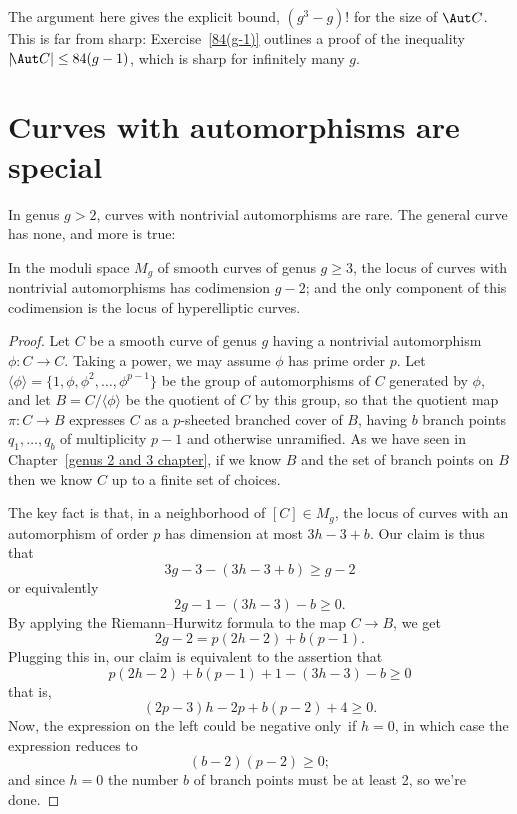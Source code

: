 The argument here gives the explicit bound,
$(g^3-g)!$
for the size
of $\Aut C$. This is far from sharp:
Exercise~\ref{84(g-1)} 
outlines a proof of
the inequality
$|\!\Aut C| \leq 84(g-1)$, which is 
sharp for infinitely many $g$.

\section{Curves with automorphisms are special}\label{curves with
automorphisms}

In genus $g > 2$, curves with nontrivial automorphisms are rare. The
general curve has none, and more is true:

\begin{lemma}
In the moduli space $M_g$ of smooth curves of genus $g \geq 3$, the
%
locus of curves with nontrivial automorphisms has codimension $g-2$;
and the only component of this codimension is the locus
of hyperelliptic curves.
\end{lemma}

\begin{proof}
Let $C$ be a smooth curve of genus $g$ 
having a nontrivial
automorphism $\phi : C \to C$. Taking a power, we may assume $\phi$
has prime order $p$.
Let $\langle \phi \rangle = \{1, \phi, \phi^2,\dots,\phi^{p-1} \}$
be the group of automorphisms of $C$ generated by $\phi$, and let $B =
C/\langle \phi \rangle $ be the quotient of $C$ by this group, so that
the quotient map $\pi : C \to B$ expresses $C$ as a $p$-sheeted branched
cover of $B$, having $b$ branch points $q_1,\dots, q_b$ of multiplicity
$p-1$ and otherwise unramified.
As we have seen in Chapter~\ref{genus 2 and 3 chapter}, if we know $B$
and the set
of branch points on $B$ then we know $C$ up to a finite set of choices.

The 
key fact is that,
in a neighborhood of $[C] \in M_g$, the locus of curves
with an automorphism of order $p$ has dimension at most $3h-3 + b$. Our
claim is thus that
$$
3g-3 - (3h-3+b) \geq g-2
$$
or equivalently
$$
2g - 1 - (3h-3) - b \geq 0.
$$
By applying the Riemann--Hurwitz formula to the map $C \to B$, we get
$$
2g-2 = p(2h-2) + b(p-1).
$$
Plugging this in, our claim is equivalent to the assertion that
$$
p(2h-2) + b(p-1) + 1 - (3h-3) - b \geq 0
$$
that is,
$$
(2p-3)h -2p + b(p-2) + 4 \geq 0.
$$
Now, the expression on the left could be negative only~if $h=0$, in
which case the expression reduces to
$$
(b-2)(p-2) \geq 0;
$$
and since $h=0$ the number $b$ of branch points must be at least 2,
so we're done.
\end{proof}

